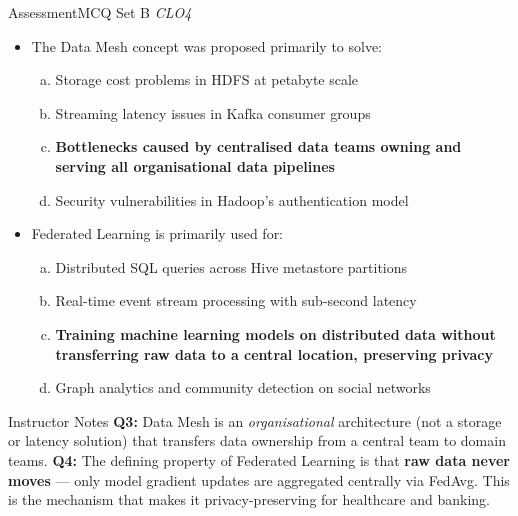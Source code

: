 \documentclass[aspectratio=169,10pt]{beamer}
\begin{document}
\begin{frame}{Assessment\textemdash MCQ Set B \hfill\small\textit{CLO4}}
  \vspace{6pt}
  \begin{itemize}
    \item[\textbf{Q3.}] The Data Mesh concept was proposed primarily to solve:
    \begin{enumerate}[(a)]
      \item Storage cost problems in HDFS at petabyte scale
      \item Streaming latency issues in Kafka consumer groups
      \item \textbf{Bottlenecks caused by centralised data teams owning and serving all organisational data pipelines}
      \item Security vulnerabilities in Hadoop's authentication model
    \end{enumerate}
  \end{itemize}
  \vspace{8pt}
  \begin{itemize}
    \item[\textbf{Q4.}] Federated Learning is primarily used for:
    \begin{enumerate}[(a)]
      \item Distributed SQL queries across Hive metastore partitions
      \item Real-time event stream processing with sub-second latency
      \item \textbf{Training machine learning models on distributed data without transferring raw data to a central location, preserving privacy}
      \item Graph analytics and community detection on social networks
    \end{enumerate}
  \end{itemize}
  \vspace{6pt}
  \begin{alertblock}{Instructor Notes}
    \textbf{Q3:} Data Mesh is an \textit{organisational} architecture (not a storage or latency solution) that transfers data ownership from a central team to domain teams.  \textbf{Q4:} The defining property of Federated Learning is that \textbf{raw data never moves} --- only model gradient updates are aggregated centrally via FedAvg.  This is the mechanism that makes it privacy-preserving for healthcare and banking.
  \end{alertblock}
\end{frame}
\end{document}
